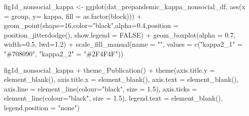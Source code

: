 \documentclass[
]{article}
\newenvironment{Shaded}{\begin{snugshade}}{\end{snugshade}}
\newcommand{\AttributeTok}[1]{\textcolor[rgb]{0.77,0.63,0.00}{#1}}
\newcommand{\ConstantTok}[1]{\textcolor[rgb]{0.00,0.00,0.00}{#1}}
\newcommand{\DecValTok}[1]{\textcolor[rgb]{0.00,0.00,0.81}{#1}}
\newcommand{\FloatTok}[1]{\textcolor[rgb]{0.00,0.00,0.81}{#1}}
\newcommand{\FunctionTok}[1]{\textcolor[rgb]{0.00,0.00,0.00}{#1}}
\newcommand{\NormalTok}[1]{#1}
\newcommand{\OtherTok}[1]{\textcolor[rgb]{0.56,0.35,0.01}{#1}}
\newcommand{\SpecialCharTok}[1]{\textcolor[rgb]{0.00,0.00,0.00}{#1}}
\newcommand{\StringTok}[1]{\textcolor[rgb]{0.31,0.60,0.02}{#1}}
\begin{document}
\begin{Shaded}
\begin{Highlighting}[]
\NormalTok{fig1d\_nonsocial\_kappa }\OtherTok{\textless{}{-}} \FunctionTok{ggplot}\NormalTok{(dat\_prepandemic\_kappa\_nonsocial\_df, }\FunctionTok{aes}\NormalTok{(}\AttributeTok{x =}\NormalTok{ group,}
                                                                        \AttributeTok{y=}\NormalTok{ kappa,}
                                                                        \AttributeTok{fill =} \FunctionTok{as.factor}\NormalTok{(block))) }\SpecialCharTok{+}
  \FunctionTok{geom\_point}\NormalTok{(}\AttributeTok{shape=}\DecValTok{16}\NormalTok{,}\AttributeTok{color=}\StringTok{"black"}\NormalTok{,}\AttributeTok{alpha=}\FloatTok{0.4}\NormalTok{,}\AttributeTok{position =} \FunctionTok{position\_jitterdodge}\NormalTok{(), }\AttributeTok{show.legend =} \ConstantTok{FALSE}\NormalTok{) }\SpecialCharTok{+} 
  \FunctionTok{geom\_boxplot}\NormalTok{(}\AttributeTok{alpha =} \FloatTok{0.7}\NormalTok{, }\AttributeTok{width=}\FloatTok{0.5}\NormalTok{, }\AttributeTok{lwd=}\FloatTok{1.2}\NormalTok{) }\SpecialCharTok{+}
  \FunctionTok{scale\_fill\_manual}\NormalTok{(}\AttributeTok{name =} \StringTok{""}\NormalTok{, }
                    \AttributeTok{values =} \FunctionTok{c}\NormalTok{(}\StringTok{"kappa2\_1"} \OtherTok{=} \StringTok{"\#708090"}\NormalTok{, }\StringTok{"kappa2\_2"} \OtherTok{=} \StringTok{"\#2F4F4F"}\NormalTok{))}


\NormalTok{fig1d\_nonsocial\_kappa }\SpecialCharTok{+} \FunctionTok{theme\_Publication}\NormalTok{() }\SpecialCharTok{+} \FunctionTok{theme}\NormalTok{(}\AttributeTok{axis.title.y =} \FunctionTok{element\_blank}\NormalTok{(),}
                                                    \AttributeTok{axis.title.x =} \FunctionTok{element\_blank}\NormalTok{(),}
                                                    \AttributeTok{axis.text =} \FunctionTok{element\_blank}\NormalTok{(), }
                                                    \AttributeTok{axis.line =} \FunctionTok{element\_line}\NormalTok{(}\AttributeTok{colour=}\StringTok{"black"}\NormalTok{, }\AttributeTok{size =} \FloatTok{1.5}\NormalTok{),}
                                                    \AttributeTok{axis.ticks =} \FunctionTok{element\_line}\NormalTok{(}\AttributeTok{colour=}\StringTok{"black"}\NormalTok{, }\AttributeTok{size =} \FloatTok{1.5}\NormalTok{),}
                                                    \AttributeTok{legend.text =} \FunctionTok{element\_blank}\NormalTok{(),}
                                                    \AttributeTok{legend.position =} \StringTok{"none"}\NormalTok{)}
\end{Highlighting}
\end{Shaded}
\end{document}
